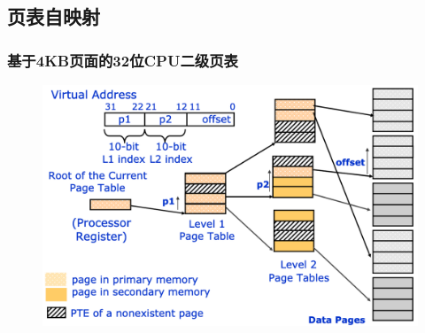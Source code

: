 \subsection{页表自映射} %
\begin{frame}
    \frametitle{基于4KB页面的32位CPU二级页表}
    \begin{figure}
    \includegraphics[width=0.7\linewidth]{figs/2-level-pagetable.png}
    \end{figure}
\end{frame}

